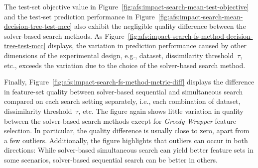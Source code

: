\documentclass{article}
\theoremstyle{definition}
\begin{document}
The test-set objective value in Figure~\ref{fig:afs:impact-search-mean-test-objective} and the test-set prediction performance in Figure~\ref{fig:afs:impact-search-mean-decision-tree-test-mcc} also exhibit the negligible quality difference between the solver-based search methods.
As Figure~\ref{fig:afs:impact-search-fs-method-decision-tree-test-mcc} displays, the variation in prediction performance caused by other dimensions of the experimental design, e.g., dataset, dissimilarity threshold~$\tau$, etc., exceeds the variation due to the choice of the solver-based search method.

Finally, Figure~\ref{fig:afs:impact-search-fs-method-metric-diff} displays the difference in feature-set quality between solver-based sequential and simultaneous search compared on each search setting separately, i.e., each combination of dataset, dissimilarity threshold~$\tau$, etc.
The figure again shows little variation in quality between the solver-based search methods except for \emph{Greedy Wrapper} feature selection.
In particular, the quality difference is usually close to zero, apart from a few outliers.
Additionally, the figure highlights that outliers can occur in both directions:
While solver-based simultaneous search can yield better feature sets in some scenarios, solver-based sequential search can be better in others.
\end{document}
